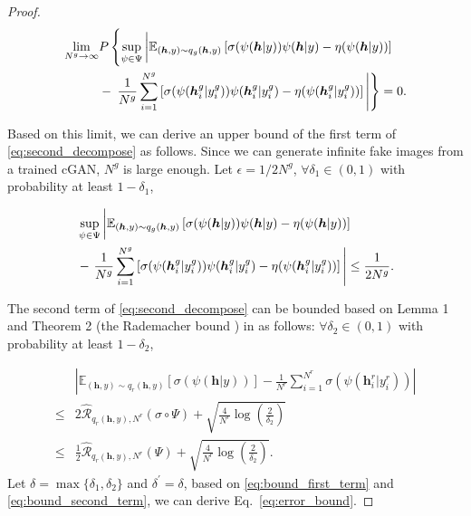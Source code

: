\documentclass[final,12pt, 3p,times]{elsarticle}
\newcommand\scalemath[2]{\scalebox{#1}{\mbox{\ensuremath{\displaystyle #2}}}}  \def\todo#1{\textcolor{red}{#1}}
\begin{document}
\begin{proof}
	\begin{equation*}
		\scalemath{1}{
			\begin{aligned}
				\lim_{N^g\rightarrow\infty} & P\left\{  \sup_{\psi\in\Psi} \left|\vphantom{\frac{1}{N^g}} \mathbb{E}_{(\bm{h},y)\sim q_g(\bm{h},y)}\left[ \sigma(\psi(\bm{h}|y))\psi(\bm{h}|y) - \eta(\psi(\bm{h}|y)) \right] \right.\right. \\
				& - \left.\left. \frac{1}{N^g}\sum_{i=1}^{N^g}\left[ \sigma(\psi(\bm{h}^g_i|y^g_i))\psi(\bm{h}^g_i|y^g_i) - \eta(\psi(\bm{h}^g_i|y^g_i)) \right]  \vphantom{\frac{1}{N^g}}\right|\right\} = 0.
			\end{aligned}
		}
	\end{equation*}
	
	Based on this limit, we can derive an upper bound of the first term of \cref{eq:second_decompose} as follows. Since we can generate infinite fake images from a trained cGAN, $N^g$ is large enough. Let $\epsilon={1}/{2N^g}$, $\forall \delta_1\in(0,1)$ with probability at least $1-\delta_1$, 
	
	\begin{equation}
		\scalemath{1}{
			\begin{aligned}
				& \sup_{\psi\in\Psi} \left|\vphantom{\frac{1}{N^g}} \mathbb{E}_{(\bm{h},y)\sim q_g(\bm{h},y)}\left[ \sigma(\psi(\bm{h}|y))\psi(\bm{h}|y) - \eta(\psi(\bm{h}|y)) \right] \right. \\
				& - \left. \frac{1}{N^g}\sum_{i=1}^{N^g}\left[ \sigma(\psi(\bm{h}^g_i|y^g_i))\psi(\bm{h}^g_i|y^g_i) - \eta(\psi(\bm{h}^g_i|y^g_i)) \right]  \vphantom{\frac{1}{N^g}}\right| \leq \frac{1}{2N^g}.
				\label{eq:bound_first_term}
			\end{aligned}
		}
	\end{equation}
	
	The second term of \cref{eq:second_decompose} can be bounded based on Lemma 1 and Theorem 2 (the Rademacher bound \cite{lafferty2010}) in \cite{ding2020subsampling} as follows: $\forall \delta_2\in(0,1)$ with probability at least $1-\delta_2$,
	
	\begin{align}
		&\left| \mathbb{E}_{(\bm{h},y)\sim q_r(\bm{h},y)}\left[ \sigma(\psi(\bm{h}|y))\right] - \frac{1}{N^r}\sum_{i=1}^{N^r}\sigma(\psi(\bm{h}^r_i|y^r_i))  \right|\nonumber\\
		\leq&2\hat{\mathcal{R}}_{q_r(\bm{h},y),N^r}(\sigma\circ\Psi) + \sqrt{\frac{4}{N^r}\log\left(\frac{2}{\delta_2}\right)}\nonumber\\
		\leq&\frac{1}{2}\hat{\mathcal{R}}_{q_r(\bm{h},y),N^r}(\Psi) + \sqrt{\frac{4}{N^r}\log\left(\frac{2}{\delta_2}\right)}.
		\label{eq:bound_second_term}
	\end{align}
	Let $\delta=\max\{\delta_1, \delta_2\}$ and $\delta^\prime=\delta$, based on \cref{eq:bound_first_term} and \eqref{eq:bound_second_term}, we can derive Eq.\ \eqref{eq:error_bound}.
\end{proof}
\end{document}
